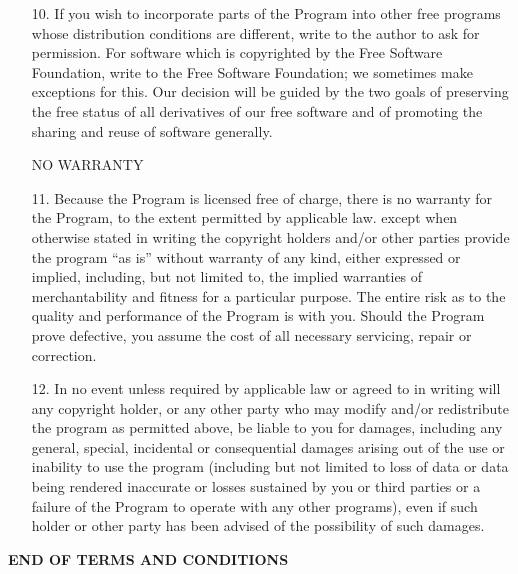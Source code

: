 \documentclass[a4paper]{report}
\begin{document}
\begin{enumerate}
\item [10.] If you wish to incorporate parts of the Program into other free
      programs whose distribution conditions are different, write to the
      author to ask for permission.  For software which is copyrighted by the
      Free Software Foundation, write to the Free Software Foundation; we
      sometimes make exceptions for this.  Our decision will be guided by the
      two goals of preserving the free status of all derivatives of our free
      software and of promoting the sharing and reuse of software generally.

\begin{center}
NO WARRANTY
\end{center}

\bfseries

\item [11.] Because the Program is licensed free of charge, there is no
      warranty for the Program, to the extent permitted by applicable law.
      except when otherwise stated in writing the copyright holders and/or
      other parties provide the program ``as is'' without warranty of any
      kind, either expressed or implied, including, but not limited to, the
      implied warranties of merchantability and fitness for a particular
      purpose.  The entire risk as to the quality and performance of the
      Program is with you.  Should the Program prove defective, you assume
      the cost of all necessary servicing, repair or correction.

\item [12.] In no event unless required by applicable law or agreed to in
      writing will any copyright holder, or any other party who may modify
      and/or redistribute the program as permitted above, be liable to you
      for damages, including any general, special, incidental or
      consequential damages arising out of the use or inability to use the
      program (including but not limited to loss of data or data being
      rendered inaccurate or losses sustained by you or third parties or a
      failure of the Program to operate with any other programs), even if
      such holder or other party has been advised of the possibility of such
      damages.

\end{enumerate}

\begin{center}
\textbf{END OF TERMS AND CONDITIONS}
\end{center}
\end{document}
